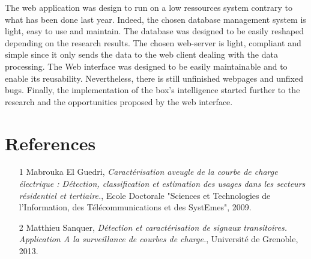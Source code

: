 The web application was design to run on a low ressources system contrary to what has been done last year. Indeed, the chosen database management system is light, easy to use and maintain. The database was designed to be easily reshaped depending on the research results. The chosen web-server is light, compliant and simple since it only sends the data to the web client dealing with the data processing. The Web interface was designed to be easily maintainable and to enable its reusability. Nevertheless, there is still unfinished webpages and unfixed bugs. Finally, the implementation of the box's intelligence started further to the research and the opportunities proposed by the web interface.


\section{References}

\begin{itemize}
	\item [1] Mabrouka El Guedri, \textit{Caract\'erisation aveugle de la courbe de charge \'electrique : D\'etection, classification et estimation des usages dans les secteurs r\'esidentiel et tertiaire.}, Ecole Doctorale "Sciences et Technologies de l'Information, des T\'el\'ecommunications et des SystEmes", 2009.

	\item [2] Matthieu Sanquer, \textit{D\'etection et caract\'erisation de signaux transitoires. Application A la surveillance de courbes de charge.}, Universit\'e de Grenoble, 2013.
\end{itemize}